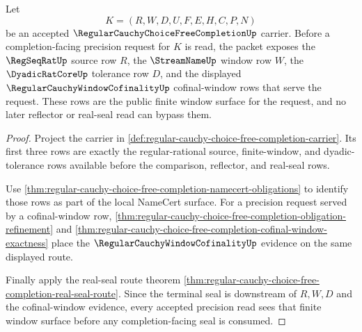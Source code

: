 \begin{theorem}
\label{thm:regular-cauchy-choice-free-completion-window-coverage}
Let
$$
K=(R,W,D,U,F,E,H,C,P,N)
$$
be an accepted $\RegularCauchyChoiceFreeCompletionUp$ carrier. Before a completion-facing precision request for $K$ is read, the packet exposes the $\RegSeqRatUp$ source row $R$, the $\StreamNameUp$ window row $W$, the $\DyadicRatCoreUp$ tolerance row $D$, and the displayed $\RegularCauchyWindowCofinalityUp$ cofinal-window rows that serve the request. These rows are the public finite window surface for the request, and no later reflector or real-seal read can bypass them.
\end{theorem}
\begin{proof}
Project the carrier in \autoref{def:regular-cauchy-choice-free-completion-carrier}. Its first three rows are exactly the regular-rational source, finite-window, and dyadic-tolerance rows available before the comparison, reflector, and real-seal rows.

Use \autoref{thm:regular-cauchy-choice-free-completion-namecert-obligations} to identify those rows as part of the local NameCert surface. For a precision request served by a cofinal-window row, \autoref{thm:regular-cauchy-choice-free-completion-obligation-refinement} and \autoref{thm:regular-cauchy-choice-free-completion-cofinal-window-exactness} place the $\RegularCauchyWindowCofinalityUp$ evidence on the same displayed route.

Finally apply the real-seal route theorem \autoref{thm:regular-cauchy-choice-free-completion-real-seal-route}. Since the terminal seal is downstream of $R,W,D$ and the cofinal-window evidence, every accepted precision read sees that finite window surface before any completion-facing seal is consumed.
\end{proof}


